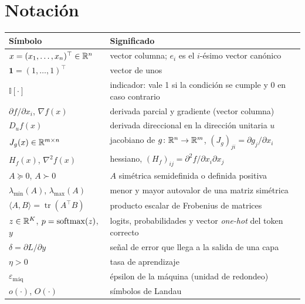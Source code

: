 \documentclass[11pt,a4paper,twoside,openany]{book}
\newcommand{\tr}{\operatorname{tr}}
\newcommand{\T}{^{\top}}
\newcommand{\uno}{\mathbf{1}}
\begin{document}
\section*{Notación}
\begin{center}
\begin{tabular}{@{}ll@{}}
\toprule
Símbolo & Significado \\
\midrule
$x=(x_1,\dots,x_n)\T\in\R^{n}$ & vector columna; $e_i$ es el $i$-ésimo vector canónico \\
$\uno=(1,\dots,1)\T$ & vector de unos \\
$\mathbb{I}[\cdot]$ & indicador: vale 1 si la condición se cumple y 0 en caso contrario \\
$\partial f/\partial x_i$, $\nabla f(x)$ & derivada parcial y gradiente (vector columna) \\
$D_u f(x)$ & derivada direccional en la dirección unitaria $u$ \\
$J_g(x)\in\mathbb{R}^{m\times n}$ & jacobiano de $g\colon\mathbb{R}^{n}\to\mathbb{R}^{m}$, $(J_g)_{ji}=\partial g_j/\partial x_i$ \\
$H_f(x)$, $\nabla^{2}f(x)$ & hessiano, $(H_f)_{ij}=\partial^{2}f/\partial x_i\partial x_j$ \\
$A\succeq 0$, $A\succ 0$ & $A$ simétrica semidefinida o definida positiva \\
$\lambda_{\min}(A)$, $\lambda_{\max}(A)$ & menor y mayor autovalor de una matriz simétrica \\
$\langle A,B\rangle=\tr(A\T B)$ & producto escalar de Frobenius de matrices \\
$z\in\mathbb{R}^{K}$, $p=\operatorname{softmax}(z)$, $y$ & logits, probabilidades y vector \emph{one-hot} del token correcto \\
$\delta=\partial L/\partial y$ & señal de error que llega a la salida de una capa \\
$\eta>0$ & tasa de aprendizaje \\
$\varepsilon_{\text{máq}}$ & épsilon de la máquina (unidad de redondeo) \\
$o(\cdot)$, $O(\cdot)$ & símbolos de Landau \\
\bottomrule
\end{tabular}
\end{center}


\tableofcontents

\mainmatter







\backmatter

\end{document}
